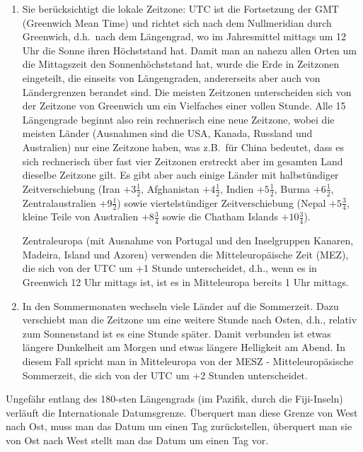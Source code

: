 \begin{enumerate}
\item
Sie 
ber\"ucksichtigt die lokale Zeitzone: UTC ist die Fortsetzung der GMT (Greenwich Mean Time) und
richtet sich nach dem Nullmeridian durch Greenwich, d.h.\ nach dem L\"angengrad, wo im Jahresmittel
mittags um 12 Uhr die Sonne ihren H\"ochststand hat. Damit man an nahezu allen Orten um die Mittagszeit
den Sonnenh\"ochststand hat, wurde die Erde in Zeitzonen eingeteilt, die einseits von L\"angengraden,
andererseits aber auch von L\"andergrenzen berandet sind. Die meisten Zeitzonen unterscheiden sich
von der Zeitzone von Greenwich um ein Vielfaches einer vollen Stunde. Alle 15 L\"angengrade beginnt also rein rechnerisch
eine neue Zeitzone, wobei die meisten L\"ander (Ausnahmen sind die USA, Kanada, Russland und
Australien) nur eine Zeitzone haben, was z.B.\ f\"ur China bedeutet, dass es sich rechnerisch \"uber 
fast vier Zeitzonen erstreckt aber im gesamten Land dieselbe Zeitzone gilt. 
Es gibt aber auch einige L\"ander mit halbst\"undiger Zeitverschiebung (Iran $+3\frac{1}{2}$, Afghanistan $+4\frac{1}{2}$,
Indien $+5\frac{1}{2}$, Burma $+6\frac{1}{2}$, Zentralaustralien $+9\frac{1}{2}$) sowie   
viertelst\"undiger Zeitverschiebung (Nepal $+5\frac{3}{4}$, kleine Teile von Australien $+8\frac{3}{4}$
sowie die Chatham Islands $+10\frac{3}{4}$). 

Zentraleuropa (mit Ausnahme von Portugal und
den Inselgruppen Kanaren, Madeira, Island und Azoren) verwenden die Mitteleurop\"aische Zeit (MEZ), die
sich von der UTC um +1 Stunde unterscheidet, d.h., wenn es in Greenwich 12 Uhr mittags ist, ist es in
Mitteleuropa bereits 1 Uhr mittags. 
\item
In den Sommermonaten 
wechseln viele L\"ander auf die Sommerzeit. Dazu verschiebt man die Zeitzone um eine
weitere Stunde nach Osten, d.h., relativ zum Sonnenstand ist es eine Stunde sp\"ater. Damit verbunden ist etwas
l\"angere Dunkelheit am Morgen und etwas l\"angere Helligkeit am Abend. In diesem Fall spricht man in
Mitteleuropa von der 
MESZ - Mitteleurop\"asische Sommerzeit, die sich von der UTC um +2 Stunden unterscheidet.      
\end{enumerate}
Ungef\"ahr entlang des 180-sten L\"angengrads (im Pazifik, durch die Fiji-Inseln) verl\"auft die Internationale Datumsgrenze.
\"Uberquert man diese Grenze von West nach Ost, muss man das Datum um einen Tag zur\"uckstellen, \"uberquert
man sie von Ost nach West stellt man das Datum um einen Tag vor. 

